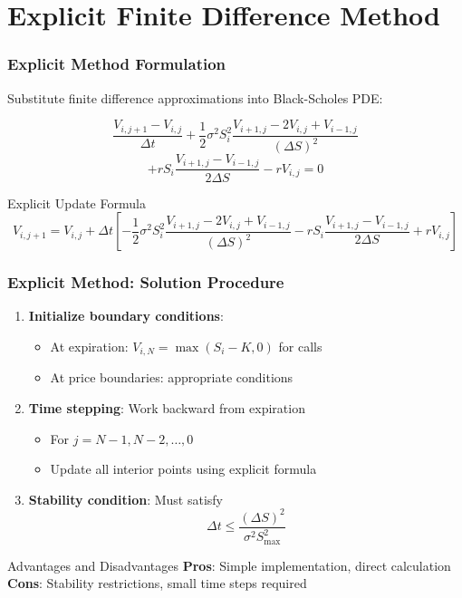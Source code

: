 \documentclass{beamer}
\begin{document}
\section{Explicit Finite Difference Method}

\begin{frame}
\frametitle{Explicit Method Formulation}
Substitute finite difference approximations into Black-Scholes PDE:

$$\frac{V_{i,j+1} - V_{i,j}}{\Delta t} + \frac{1}{2}\sigma^2 S_i^2 \frac{V_{i+1,j} - 2V_{i,j} + V_{i-1,j}}{(\Delta S)^2}$$
$$+ rS_i \frac{V_{i+1,j} - V_{i-1,j}}{2\Delta S} - rV_{i,j} = 0$$

\begin{block}{Explicit Update Formula}
$$V_{i,j+1} = V_{i,j} + \Delta t \left[ -\frac{1}{2}\sigma^2 S_i^2 \frac{V_{i+1,j} - 2V_{i,j} + V_{i-1,j}}{(\Delta S)^2} - rS_i \frac{V_{i+1,j} - V_{i-1,j}}{2\Delta S} + rV_{i,j} \right]$$
\end{block}
\end{frame}

\begin{frame}
\frametitle{Explicit Method: Solution Procedure}
\begin{enumerate}
\item \textbf{Initialize boundary conditions}:
   \begin{itemize}
   \item At expiration: $V_{i,N} = \max(S_i - K, 0)$ for calls
   \item At price boundaries: appropriate conditions
   \end{itemize}

\item \textbf{Time stepping}: Work backward from expiration
   \begin{itemize}
   \item For $j = N-1, N-2, \ldots, 0$
   \item Update all interior points using explicit formula
   \end{itemize}

\item \textbf{Stability condition}: Must satisfy
   $$\Delta t \leq \frac{(\Delta S)^2}{\sigma^2 S_{\max}^2}$$
\end{enumerate}

\begin{block}{Advantages and Disadvantages}
\textbf{Pros}: Simple implementation, direct calculation\\
\textbf{Cons}: Stability restrictions, small time steps required
\end{block}
\end{frame}
\end{document}
